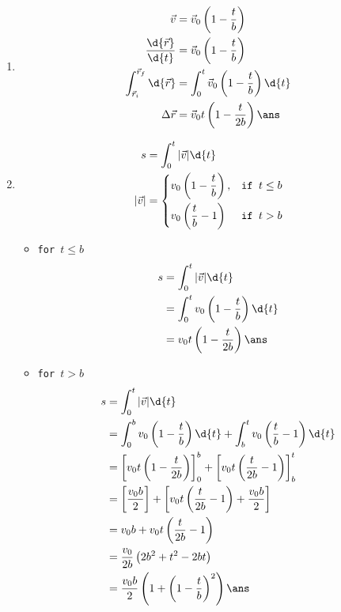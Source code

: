 \documentclass{article}
\begin{document}
\vspace*{\fill}
\vspace*{\fill}
\pagebreak
\vtitle[SOLUTION]
\begin{enumerate}[label=(\alph*)]
\item
\addtolength{\jot}{3ex}
\begin{align*}
\vec{v} &= \vec{v}_0\left( 1-\dfrac{t}{b} \right) \\
\dfrac{\d{\vec{r}}}{\d{t}} &= \vec{v}_0\left( 1-\dfrac{t}{b} \right) \\
\int_{\vec{r}_i}^{\vec{r}_f} \d{\vec{r}} &= \int_0^t \vec{v}_0\left( 1-\dfrac{t}{b} \right) \d{t}\\
\Delta \vec{r} &= \vec{v}_0 t\left(1-\dfrac{t}{2b} \right) \ans
\end{align*}

\pagebreak
\item
\begin{align*}
s &= \int_0^t |\vec{v}| \d{t}  \\
|\vec{v}| &= 
	\begin{cases}  
		v_0\left(1-\dfrac{t}{b}\right),& \texttt{if $t\leq b$}\\[3 mm]
		v_0\left(\dfrac{t}{b} - 1\right)& \texttt{if $t>b$}
	\end{cases} \\
\end{align*}
\begin{itemize}
\item \texttt{for $t\leq b$}
\begin{align*}
s &= \int_0^t |\vec{v}| \d{t}  \\
  &= \int_0^t v_0\left(1-\dfrac{t}{b} \right) \d{t}\\
  &= v_0 t\left(1-\dfrac{t}{2b} \right) \ans
\end{align*}

\item \texttt{for $t>b$}
\begin{align*}
s &= \int_0^t |\vec{v}| \d{t}  \\
  &= \int_0^b v_0\left(1-\dfrac{t}{b} \right) \d{t} + \int_b^t v_0\left(\dfrac{t}{b} - 1\right) \d{t}\\
  &= \left[ v_0 t\left(1-\dfrac{t}{2b}\right)\right]_0^b + \left[ v_0 t\left(\dfrac{t}{2b}-1\right)\right]_b^t \\
  &=\left[\dfrac{v_0b}{2} \right] + \left[v_0t\left(\dfrac{t}{2b}-1\right) + \dfrac{v_0b}{2}\right] \\
  &= v_0b + v_0t\left(\dfrac{t}{2b}-1\right) \\
  &= \dfrac{v_0}{2b} \left(2b^2+t^2-2bt\right)\\
  &= \dfrac{v_0b}{2} \left(1+\left( 1 -\dfrac{t}{b} \right)^2\right)\ans
\end{align*}
\end{itemize}
\end{enumerate}
\end{document}
